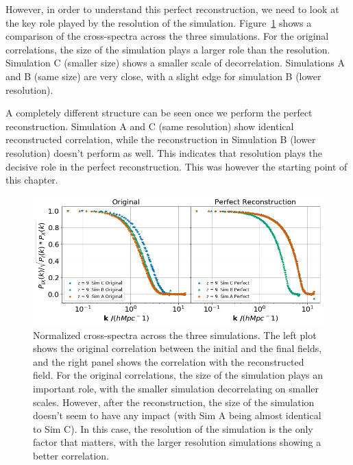 However, in order to understand this perfect reconstruction, we need to look at the key role played by the resolution of the simulation. Figure~\ref{fig:3.3} shows a comparison of the cross-spectra across the three simulations. For the original correlations, the size of the simulation plays a larger role than the resolution. Simulation C (smaller size) shows a smaller scale of decorrelation. Simulations A and B (same size) are very close, with a slight edge for simulation B (lower resolution). 

A completely different structure can be seen once we perform the perfect reconstruction. Simulation A and C (same resolution) show identical reconstructed correlation, while the reconstruction in Simulation B (lower resolution) doesn't perform as well. This indicates that resolution plays the decisive role in the perfect reconstruction. This was however the starting point of this chapter. 



\begin{figure}
    \centering
    \includegraphics[width=1\columnwidth]{images/perfRecon/simComp.png}%
    
    \caption{
    Normalized cross-spectra across the three simulations. The left plot shows the original correlation between the initial and the final fields, and the right panel shows the correlation with the reconstructed field. For the original correlations, the size of the simulation plays an important role, with the smaller simulation decorrelating on smaller scales. However, after the reconstruction, the size of the simulation doesn't seem to have any impact (with Sim A being almost identical to Sim C). In this case, the resolution of the simulation is the only factor that matters, with the larger resolution simulations showing a better correlation.
    }
    
    \label{fig:3.3}
\end{figure}

